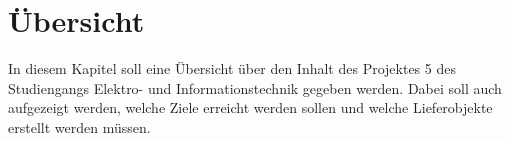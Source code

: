 	\clearpage
\section{Übersicht}\label{sec:Uebersicht}

In diesem Kapitel soll eine Übersicht über den Inhalt des Projektes 5 des Studiengangs Elektro- und Informationstechnik gegeben werden. Dabei soll auch aufgezeigt werden, welche Ziele erreicht werden sollen und welche Lieferobjekte erstellt werden müssen.

 








